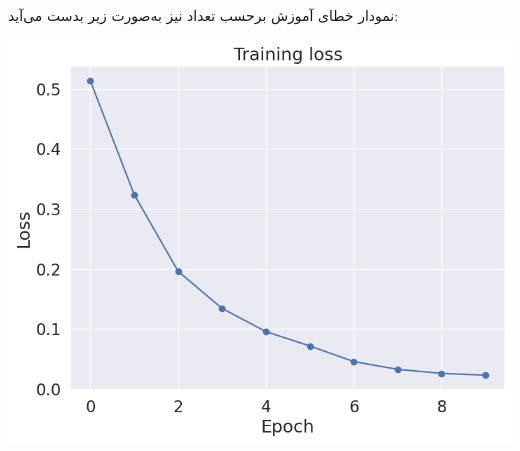 \begin{qsolve}
	نمودار خطای آموزش برحسب تعداد  نیز به‌صورت زیر بدست می‌آید:
	
	\begin{center}
		\includegraphics*[width=0.8\linewidth]{pics/img15.png}
		\label{نمودار خطای آموزش}
	\end{center}
	
	
	
\end{qsolve}